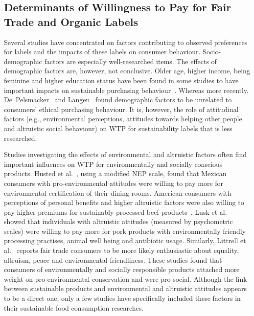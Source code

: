 \documentclass[sustainability,article,accept,moreauthors,pdftex,10pt,a4paper]{Definitions/mdpi}
\theoremstyle{mdpi}
\newcounter{ex}
\newcounter{re}
\theoremstyle{mdpidefinition}
\begin{document}
\subsection{Determinants of Willingness to Pay for Fair Trade and Organic Labels}
\par{Several studies have concentrated on factors contributing to observed preferences for labels and the impacts of these labels on consumer behaviour. Socio-demographic factors are especially well-researched items. The effects of demographic factors are, however, not conclusive. Older age, higher income, being feminine and higher education status have been found in some studies to have important impacts on sustainable purchasing behaviour~\cite{littrell1999social,Carrigan2001,Laroche2001}. Whereas more recently, De~Pelsmacker~\cite{DePelsmacker2005} and Langen~\cite{Langen2013} found demographic factors to be unrelated to consumers' ethical purchasing behaviour. It is, however, the role of attitudinal factors (e.g., environmental perceptions, attitudes towards helping other people and altruistic social behaviour) on WTP for sustainability labels that is less researched.}
\par{Studies investigating the effects of environmental and altruistic factors often find important influences on WTP for environmentally and socially conscious products. Husted et al.~\cite{HUSTED2014}, using a modified NEP %
scale, found that Mexican consumers with pro-environmental attitudes were willing to pay more for environmental certification of their dining rooms. American consumers with perceptions of personal benefits and higher altruistic factors were also willing to pay higher premiums for sustainably-processed beef products~\cite{Umberger2009}. Lusk et al.~\cite{Lusk2007} showed that individuals with altruistic attitudes (measured by psychometric scales) were willing to pay more for pork products with environmentally friendly processing practises, animal well being and antibiotic usage. Similarly, Littrell et al.~\cite{littrell1999social} reports fair trade consumers to be more likely enthusiastic about equality, altruism, peace and environmental friendliness. These studies found that consumers of environmentally and socially responsible products attached more weight on pro-environmental conservation and were pro-social. Although the link between sustainable products and environmental and altruistic attitudes appears to be a direct one, only a few studies have specifically included these factors in their sustainable food consumption researches.}
\end{document}
